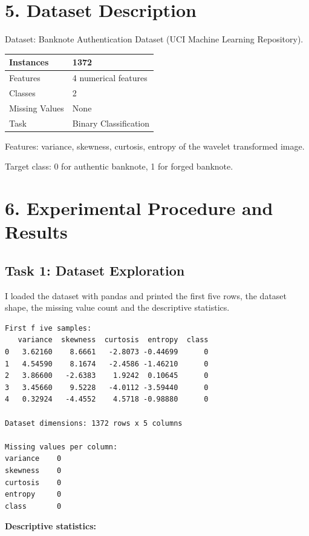 \documentclass[11pt]{article}
\begin{document}
\section*{5. Dataset Description}
Dataset: Banknote Authentication Dataset (UCI Machine Learning Repository).

\begin{center}
\begin{tabular}{|l|l|}
\hline
Instances & 1372 \\ \hline
Features & 4 numerical features \\ \hline
Classes & 2 \\ \hline
Missing Values & None \\ \hline
Task & Binary Classification \\ \hline
\end{tabular}
\end{center}

Features: variance, skewness, curtosis, entropy of the wavelet transformed image.

Target class: 0 for authentic banknote, 1 for forged banknote.

\section*{6. Experimental Procedure and Results}

\subsection*{Task 1: Dataset Exploration}
I loaded the dataset with pandas and printed the first five rows, the dataset shape, the missing
value count and the descriptive statistics.

{\scriptsize
\begin{verbatim}  
First f ive samples:
   variance  skewness  curtosis  entropy  class
0   3.62160    8.6661   -2.8073 -0.44699      0
1   4.54590    8.1674   -2.4586 -1.46210      0
2   3.86600   -2.6383    1.9242  0.10645      0
3   3.45660    9.5228   -4.0112 -3.59440      0
4   0.32924   -4.4552    4.5718 -0.98880      0

Dataset dimensions: 1372 rows x 5 columns

Missing values per column:
variance    0
skewness    0
curtosis    0
entropy     0
class       0
\end{verbatim}
}

\textbf{Descriptive statistics:}
\end{document}
